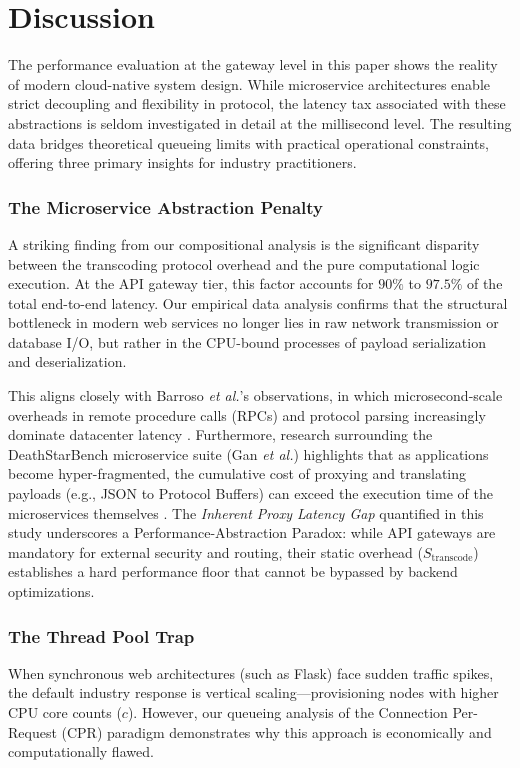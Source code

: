 \documentclass{ieeeaccess}
\begin{document}
	\section{Discussion}
	\label{sec:discuss}
	
	The performance evaluation at the gateway level in this paper shows the reality of modern cloud-native system design. While microservice architectures enable strict decoupling and flexibility in protocol, the latency tax associated with these abstractions is seldom investigated in detail at the millisecond level. The resulting data bridges theoretical queueing limits with practical operational constraints, offering three primary insights for industry practitioners.
	
	\subsubsection{The Microservice Abstraction Penalty}
	A striking finding from our compositional analysis is the significant disparity between the transcoding protocol overhead and the pure computational logic execution. At the API gateway tier, this factor accounts for $90\%$ to $97.5\%$ of the total end-to-end latency. Our empirical data analysis confirms that the structural bottleneck in modern web services no longer lies in raw network transmission or database I/O, but rather in the CPU-bound processes of payload serialization and deserialization.
	
	This aligns closely with Barroso \emph{et al.}'s observations, in which microsecond-scale overheads in remote procedure calls (RPCs) and protocol parsing increasingly dominate datacenter latency \cite{barroso2017attack}. Furthermore, research surrounding the DeathStarBench microservice suite (Gan \emph{et al.}) highlights that as applications become hyper-fragmented, the cumulative cost of proxying and translating payloads (e.g., JSON to Protocol Buffers) can exceed the execution time of the microservices themselves \cite{gan2019deathstarbench}. The \textit{Inherent Proxy Latency Gap} quantified in this study underscores a Performance-Abstraction Paradox: while API gateways are mandatory for external security and routing, their static overhead ($S_{\text{transcode}}$) establishes a hard performance floor that cannot be bypassed by backend optimizations.
	
	\subsubsection{The Thread Pool Trap}
	When synchronous web architectures (such as Flask) face sudden traffic spikes, the default industry response is vertical scaling—provisioning nodes with higher CPU core counts ($c$). However, our queueing analysis of the Connection Per-Request (CPR) paradigm demonstrates why this approach is economically and computationally flawed.
	
\end{document}
